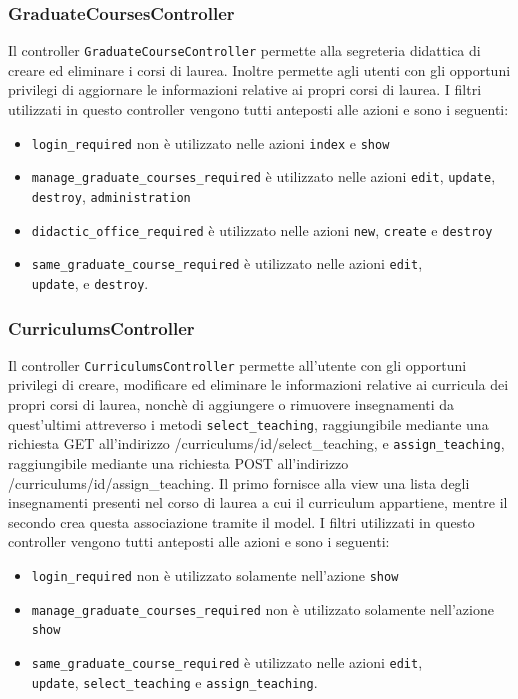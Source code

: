 \documentclass[11pt,a4paper]{article}
\begin{document}
\subsubsection{GraduateCoursesController}
Il controller \verb|GraduateCourseController| permette alla segreteria didattica di creare ed eliminare i corsi di laurea. Inoltre permette agli utenti con gli opportuni privilegi di aggiornare le informazioni relative ai propri corsi di laurea.
I filtri utilizzati in questo controller vengono tutti anteposti alle azioni e sono i seguenti:
\begin{itemize}
 \item \verb|login_required| non è utilizzato nelle azioni \verb|index| e \verb|show|
 \item \verb|manage_graduate_courses_required| è utilizzato nelle azioni \verb|edit|, \verb|update|, \verb|destroy|, \verb|administration|
 \item \verb|didactic_office_required| è utilizzato nelle azioni \verb|new|, \verb|create| e \verb|destroy|
 \item \verb|same_graduate_course_required| è utilizzato nelle azioni \verb|edit|,\\ \verb|update|, e \verb|destroy|.
\end{itemize}
\subsubsection{CurriculumsController}
Il controller \verb|CurriculumsController| permette all'utente con gli opportuni privilegi di creare, modificare ed eliminare le informazioni relative ai curricula dei propri corsi di laurea, nonchè di aggiungere o rimuovere insegnamenti da quest'ultimi attreverso i metodi \verb|select_teaching|, raggiungibile mediante una richiesta GET all'indirizzo /curriculums/id/select\_teaching, e \verb|assign_teaching|, raggiungibile mediante una richiesta POST all'indirizzo /curriculums/id/assign\_teaching. Il primo fornisce alla view una lista degli insegnamenti presenti nel corso di laurea a cui il curriculum appartiene, mentre il secondo crea questa associazione tramite il model.
I filtri utilizzati in questo controller vengono tutti anteposti alle azioni e sono i seguenti:
\begin{itemize}
 \item \verb|login_required| non è utilizzato solamente nell'azione \verb|show|
 \item \verb|manage_graduate_courses_required| non è utilizzato solamente nell'azione \verb|show|
 \item \verb|same_graduate_course_required| è utilizzato nelle azioni \verb|edit|,\\ \verb|update|, \verb|select_teaching| e \verb|assign_teaching|.
\end{itemize}
\end{document}
